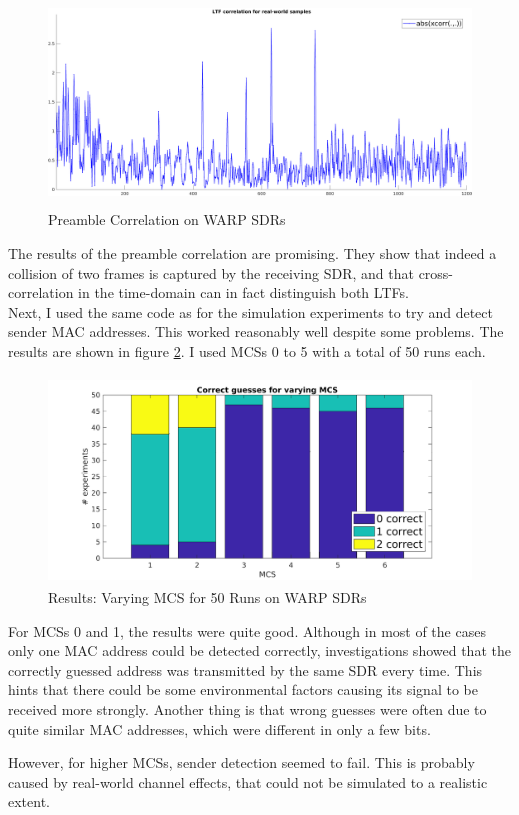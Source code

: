 \begin{figure}[H]
	\centering
  \includegraphics[height=5.5cm]{gfx/plots/warp-preamble}
	\caption{Preamble Correlation on WARP SDRs}
	\label{fig:warp_preamble_corr}
\end{figure}

The results of the preamble correlation are promising. They show that indeed a collision of two frames is captured by the receiving \gls{SDR}, and that cross-correlation in the time-domain can in fact distinguish both \glspl{LTF}.\\

Next, I used the same code as for the simulation experiments to try and detect sender \gls{MAC} addresses. This worked reasonably well despite some problems. The results are shown in figure \ref{fig:warp-mcs-results}. I used \glspl{MCS} 0 to 5 with a total of 50 runs each.

\begin{figure}[H]
	\centering
	\includegraphics[height=5.5cm]{gfx/plots/warp-mcs}
	\caption{Results: Varying MCS for 50 Runs on WARP SDRs}
	\label{fig:warp-mcs-results}
\end{figure}

For \glspl{MCS} 0 and 1, the results were quite good. Although in most of the cases only one \gls{MAC} address could be detected correctly, investigations showed that the correctly guessed address was transmitted by the same \gls{SDR} every time. This hints that there could be some environmental factors causing its signal to be received more strongly. Another thing is that wrong guesses were often due to quite similar \gls{MAC} addresses, which were different in only a few bits.

However, for higher \glspl{MCS}, sender detection seemed to fail. This is probably caused by real-world channel effects, that could not be simulated to a realistic extent.
